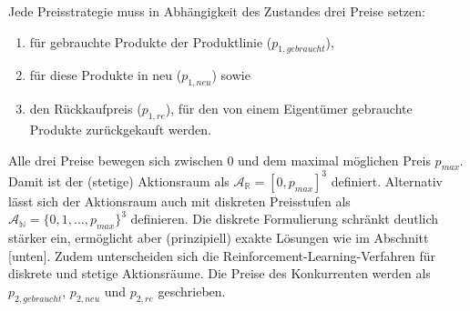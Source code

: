 Jede Preisstrategie muss in Abhängigkeit des Zustandes drei Preise setzen:
\begin{enumerate}
	\item für gebrauchte Produkte der Produktlinie ($p_{1, gebraucht}$),
	\item für diese Produkte in neu ($p_{1, neu}$) sowie
	\item den Rückkaufpreis ($p_{1, re}$), für den von einem Eigentümer gebrauchte Produkte zurückgekauft werden.
\end{enumerate}
Alle drei Preise bewegen sich zwischen 0 und dem maximal möglichen Preis $p_{max}$.
Damit ist der (stetige) Aktionsraum als $\mathcal{A}_\mathbb{R}=[0, p_{max}]^3$ definiert.
Alternativ lässt sich der Aktionsraum auch mit diskreten Preisstufen als $\mathcal{A}_\mathbb{N}=\{0, 1, \ldots, p_{max}\}^3$ definieren.
Die diskrete Formulierung schränkt deutlich stärker ein, ermöglicht aber (prinzipiell) exakte Lösungen wie im Abschnitt [unten].
Zudem unterscheiden sich die Reinforcement-Learning-Verfahren für diskrete und stetige Aktionsräume.
Die Preise des Konkurrenten werden als $p_{2, gebraucht}$, $p_{2, neu}$ und $p_{2, re}$ geschrieben.

